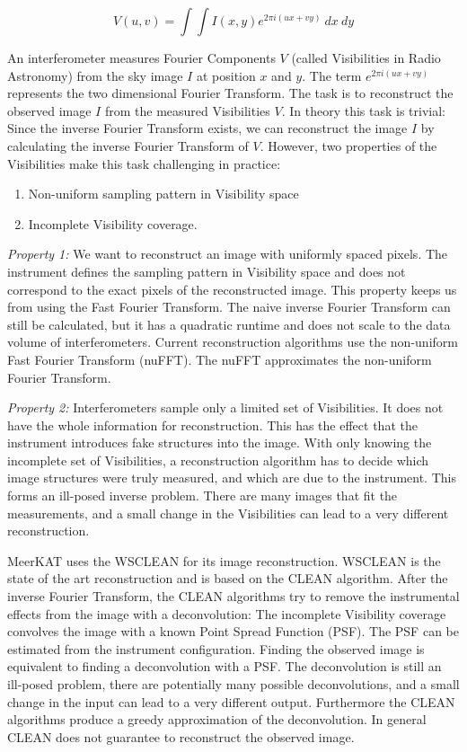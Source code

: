 \begin{equation}\label{intro:measurement}
V(u, v) = \int\int I(x, y) e^{2 \pi i (ux+vy)} \: dx \: dy
\end{equation}

An interferometer measures Fourier Components $V$ (called Visibilities in Radio Astronomy) from the sky image $I$ at position $x$ and $y$. The term $e^{2 \pi i (ux+vy)}$ represents the two dimensional Fourier Transform. The task is to reconstruct the observed image $I$ from the measured Visibilities $V$. In theory this task is trivial: Since the inverse Fourier Transform exists, we can reconstruct the image $I$ by calculating the inverse Fourier Transform of $V$. However, two properties of the Visibilities make this task challenging in practice:

\begin{enumerate}
	\item Non-uniform sampling pattern in Visibility space
	\item Incomplete Visibility coverage. 
\end{enumerate} 

\textit{Property 1:} We want to reconstruct an image with uniformly spaced pixels. The instrument defines the sampling pattern in Visibility space and does not correspond to the exact pixels of the reconstructed image. This property keeps us from using the Fast Fourier Transform. The naive inverse Fourier Transform can still be calculated, but it has a quadratic runtime and does not scale to the data volume of interferometers. Current reconstruction algorithms use the non-uniform Fast Fourier Transform (nuFFT). The nuFFT approximates the non-uniform Fourier Transform. 

\textit{Property 2:} Interferometers sample only a limited set of Visibilities. It does not have the whole information for reconstruction. This has the effect that the instrument introduces fake structures into the image. With only knowing the incomplete set of Visibilities, a reconstruction algorithm has to decide which image structures were truly measured, and which are due to the instrument. This forms an ill-posed inverse problem. There are many images that fit the measurements, and a small change in the Visibilities can lead to a very different reconstruction.

MeerKAT uses the WSCLEAN\cite{wsclean} for its image reconstruction. WSCLEAN is the state of the art reconstruction and is based on the CLEAN algorithm\cite{rich2008multi}\cite{rau2011multi}. After the inverse Fourier Transform, the CLEAN algorithms try to remove the instrumental effects from the image with a deconvolution: The incomplete Visibility coverage convolves the image with a known Point Spread Function (PSF). The PSF can be estimated from the instrument configuration. Finding the observed image is equivalent to finding a deconvolution with a PSF. The deconvolution is still an ill-posed problem, there are potentially many possible deconvolutions, and a small change in the input can lead to a very different output. Furthermore the CLEAN algorithms produce a greedy approximation of the deconvolution. In general CLEAN does not guarantee to reconstruct the observed image.


